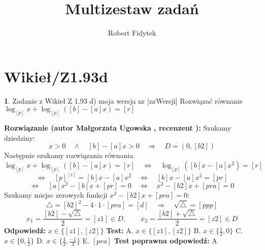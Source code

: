 \documentclass[12pt, a4paper]{article}
\title{Multizestaw zadań}
\author{Robert Fidytek}
\date{}
\theoremstyle{definition} %
\newtheorem{zad}{}
\newcommand{\kategoria}[1]{\section{#1}} %
\newcommand{\zadStart}[1]{\begin{zad}#1\newline} %
\newcommand{\zadStop}{\end{zad}}   %
\newcommand{\rozwStart}[2]{\noindent \textbf{Rozwiązanie (autor #1 , recenzent #2): }\newline} %
\newcommand{\rozwStop}{\newline}                                            %
\newcommand{\odpStart}{\noindent \textbf{Odpowiedź:}\newline}    %
\newcommand{\odpStop}{\newline}                                             %
\newcommand{\testStart}{\noindent \textbf{Test:}\newline} %
\newcommand{\testStop}{\newline} %
\newcommand{\kluczStart}{\noindent \textbf{Test poprawna odpowiedź:}\newline} %
\newcommand{\kluczStop}{\newline} %
\begin{document}
\maketitle


\kategoria{Wikieł/Z1.93d}
\zadStart{Zadanie z Wikieł Z 1.93 d) moja wersja nr [nrWersji]}
Rozwiązać równanie $\log_{[p]}{x} + \log_{[p]}{([b]-[a]x)} = [r]$
\zadStop
\rozwStart{Małgorzata Ugowska}{}
Szukamy dziedziny:
$$x>0 \quad \land \quad [b]-[a]x >0 \quad \Longrightarrow \quad D = (0, [b2])$$
Następnie szukamy rozwiązania równania.
$$\log_{[p]}{x} + \log_{[p]}{([b]-[a]x)} = [r] \quad \Longleftrightarrow \quad \log_{[p]}{([b]x-[a]x^2)} = [r]$$
$$ \Longleftrightarrow \quad [p]^{[r]} = [b]x-[a]x^2 \quad \Longleftrightarrow \quad [b]x-[a]x^2 = [pr]$$
$$ \Longleftrightarrow \quad [a]x^2 - [b]x +[pr]= 0 \quad \Longleftrightarrow \quad x^2 - [b2]x +[pra]= 0 $$
Szukamy miejsc zerowych funkcji $x^2 - [b2]x +[pra]= 0 $:
$$ \bigtriangleup = [b2]^2-4 \cdot 1 \cdot [pra] = [d] \quad  \Longrightarrow \quad \sqrt{\bigtriangleup}=[ppp]$$
$$ x_1=\frac{[b2]-\sqrt{\bigtriangleup}}{2} = [z1] \in D, \qquad x_2=\frac{[b2]+\sqrt{\bigtriangleup}}{2} = [z2] \in D$$
\rozwStop
\odpStart
$x \in \{[z1], [z2]\}$
\odpStop
\testStart
A. $x \in \{[z1], [z2]\}$
B. $x \in \{\frac{1}{2}, 0\}$
C. $x \in \{0, \frac{1}{2}\}$
D. $x \in \{\frac{4}{3}, \frac{-1}{3}\}$
E. $[pra]$
\testStop
\kluczStart
A
\kluczStop
\end{document}
